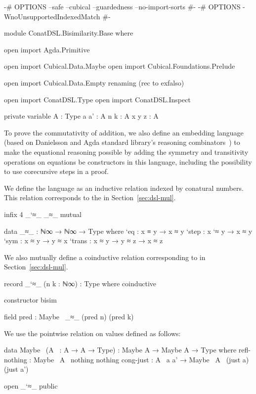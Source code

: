 \begin{code}[hide]
{-# OPTIONS --safe --cubical --guardedness --no-import-sorts #-}
{-# OPTIONS -WnoUnsupportedIndexedMatch #-}

module ConatDSL.Bisimilarity.Base where

open import Agda.Primitive

open import Cubical.Data.Maybe
open import Cubical.Foundations.Prelude

open import Cubical.Data.Empty
  renaming (rec to exfalso)

open import ConatDSL.Type
open import ConatDSL.Inspect

private variable
  A : Type
  a a' : A
  n k : A
  x y z : A
\end{code}
To prove the commutativity of addition, we also define an embedding language
(based on Danielsson \cite{danielsson-beating} and Agda standard library's
 reasoning combinators~\cite{agda-stdlib}) to make the equational
reasoning possible by adding the symmetry and transitivity operations on
equations be constructors in this language, including the possibility to use
corecursive steps in a proof.

We define the language as an inductive relation indexed by conatural numbers.
This relation corresponds to the  in
Section~\ref{sec:dsl-mul}.
\begin{code}[hide]
infix 4 _`≈_ _≈_
mutual
\end{code}
\begin{code}
  data _≈_ : ℕ∞ → ℕ∞ → Type where
    `eq     : x ≡ y → x ≈ y
    `step   : x `≈ y → x ≈ y
    `sym    : x ≈ y → y ≈ x
    `trans  : x ≈ y → y ≈ z → x ≈ z
\end{code}
\begin{AgdaMultiCode}
We also mutually define a coinductive relation corresponding to
 in Section~\ref{sec:dsl-mul}.
\begin{code}
  record _`≈_ (n k : ℕ∞) : Type where
    coinductive
\end{code}
\begin{code}[hide]
    constructor bisim
\end{code}
\begin{code}
    field
      pred : Maybe~ _≈_ (pred n) (pred k)
\end{code}
\end{AgdaMultiCode}
We use the pointwise relation on  values defined as follows:
\begin{code}
  data Maybe~ (A~ : A → A → Type) :
    Maybe A → Maybe A → Type
    where
      refl-nothing : Maybe~ A~ nothing nothing
      cong-just : A~ a a' → Maybe~ A~ (just a) (just a')
\end{code}
\begin{code}[hide]
open _`≈_ public
\end{code}

